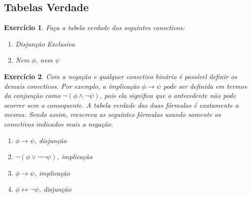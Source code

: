 \documentclass[a4paper,10pt]{article}
\newtheorem{exrcc}{Exercício}[subsection] %
\begin{document}
\subsection{Tabelas Verdade}

\begin{exrcc}
Faça a tabela verdade dos seguintes conectivos:
\begin{enumerate}
\setlength{\itemsep}{0pt}
 \item Disjunção Exclusiva
 \item Nem $\phi$, nem $\psi$
\end{enumerate}
\end{exrcc}

\begin{exrcc}
Com a negação e qualquer conectivo binário é possível definir os demais
conectivos. Por exemplo, a implicação $\phi\rightarrow\psi$ pode ser definida em termos
da conjunção como $\neg(\phi\wedge\neg\psi)$, pois ela significa que o antecedente não
pode ocorrer sem o consequente. A tabela verdade das duas fórmulas é exatamente a mesma.
Sendo assim, reescreva as seguintes fórmulas usando somente os conectivos indicados
mais a negação. 

\begin{enumerate}
\setlength{\itemsep}{0pt}
 \item $\phi\rightarrow\psi$, disjunção
 \item $\neg(\phi\vee\neg\neg\psi)$, implicação
 \item $\phi\rightarrow\psi$, implicação
 \item $\phi\leftrightarrow\neg\psi$, disjunção
\end{enumerate}

\end{exrcc}
\end{document}
